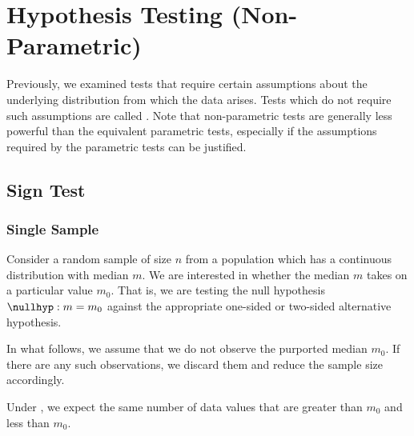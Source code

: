 \chapter{Hypothesis Testing (Non-Parametric)}

Previously, we examined tests that require certain assumptions about the underlying distribution from which the data arises. Tests which do not require such assumptions are called . Note that non-parametric tests are generally less powerful than the equivalent parametric tests, especially if the assumptions required by the parametric tests can be justified.

\section{Sign Test}

\subsection{Single Sample}

Consider a random sample of size $n$ from a population which has a continuous distribution with median $m$. We are interested in whether the median $m$ takes on a particular value $m_0$. That is, we are testing the null hypothesis $\nullhyp: m = m_0$ against the appropriate one-sided or two-sided alternative hypothesis.

In what follows, we assume that we do not observe the purported median $m_0$. If there are any such observations, we discard them and reduce the sample size accordingly.

Under \nullhyp, we expect the same number of data values that are greater than $m_0$ and less than $m_0$.

\begin{figure}[H]
    \centering
    \caption{}
\end{figure}

